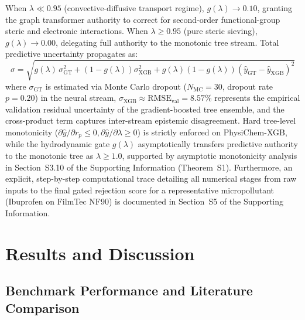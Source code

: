 \documentclass[11pt]{article}
\begin{document}
When $\lambda \ll 0.95$ (convective-diffusive transport regime), $g(\lambda) \to 0.10$, granting the graph transformer authority to correct for second-order functional-group steric and electronic interactions. When $\lambda \geq 0.95$ (pure steric sieving), $g(\lambda) \to 0.00$, delegating full authority to the monotonic tree stream. Total predictive uncertainty propagates as:
\begin{equation}
\sigma = \sqrt{g(\lambda)\,\sigma_{\mathrm{GT}}^2 + \left(1-g(\lambda)\right)\sigma_{\mathrm{XGB}}^2 + g(\lambda)\left(1-g(\lambda)\right)\left(\hat{y}_{\mathrm{GT}} - \hat{y}_{\mathrm{XGB}}\right)^2}
\label{eq:mixture_sigma}
\end{equation}
where $\sigma_{\mathrm{GT}}$ is estimated via Monte Carlo dropout ($N_{\mathrm{MC}} = 30$, dropout rate $p=0.20$) in the neural stream, $\sigma_{\mathrm{XGB}} \approx \mathrm{RMSE}_{\mathrm{val}} = 8.57\%$ represents the empirical validation residual uncertainty of the gradient-boosted tree ensemble, and the cross-product term captures inter-stream epistemic disagreement. Hard tree-level monotonicity ($\partial \hat{y} / \partial r_p \leq 0, \partial \hat{y} / \partial \lambda \geq 0$) is strictly enforced on PhysiChem-XGB, while the hydrodynamic gate $g(\lambda)$ asymptotically transfers predictive authority to the monotonic tree as $\lambda \ge 1.0$, supported by asymptotic monotonicity analysis in Section~S3.10 of the Supporting Information (Theorem~S1). Furthermore, an explicit, step-by-step computational trace detailing all numerical stages from raw inputs to the final gated rejection score for a representative micropollutant (Ibuprofen on FilmTec NF90) is documented in Section~S5 of the Supporting Information.

\section{Results and Discussion}
\label{sec:results}

\subsection{Benchmark Performance and Literature Comparison}
\label{subsec:benchmark}
\end{document}
